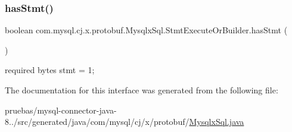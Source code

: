 \subsubsection{\texorpdfstring{has\+Stmt()}{hasStmt()}}
{\footnotesize\ttfamily boolean com.\+mysql.\+cj.\+x.\+protobuf.\+Mysqlx\+Sql.\+Stmt\+Execute\+Or\+Builder.\+has\+Stmt (\begin{DoxyParamCaption}{ }\end{DoxyParamCaption})}

{\ttfamily required bytes stmt = 1;} 

The documentation for this interface was generated from the following file\+:\begin{DoxyCompactItemize}
\item 
pruebas/mysql-\/connector-\/java-\/8../src/generated/java/com/mysql/cj/x/protobuf/\mbox{\hyperlink{_mysqlx_sql_8java}{Mysqlx\+Sql.\+java}}\end{DoxyCompactItemize}
